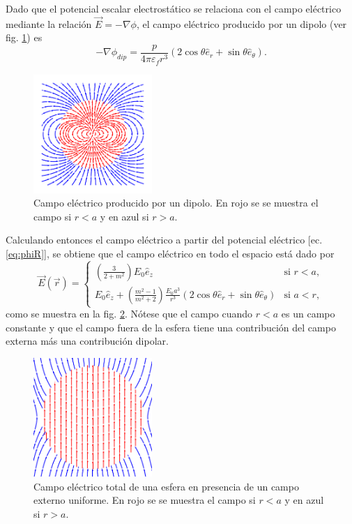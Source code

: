 \documentclass[letterpaper, 12pt] {article}
\begin{document}
Dado que el potencial escalar electrostático se relaciona con el campo eléctrico mediante la relación $\vec{E}=-\nabla\phi$,  el campo eléctrico producido por un dipolo (ver fig. \ref{fig:dip}) es
\begin{equation*}
- \nabla\phi_{dip} = \frac{p}{4\pi\varepsilon_f r^3} (2\cos\theta\hat{e}_r + \sin\theta\hat{e}_\theta).
\end{equation*}
\begin{figure}[t]\centering
\begin{minipage}{.8\linewidth}\centering
\includegraphics[width=4.5cm]{dipolo}
\caption{\footnotesize  Campo eléctrico producido por un dipolo. En rojo se se muestra el campo si $r<	a$ y en azul si $r>a$.}
\label{fig:dip}
\end{minipage}
\end{figure}
Calculando entonces el campo eléctrico a partir del potencial eléctrico [ec. \eqref{eq:phiR}], se obtiene que el campo eléctrico en todo el espacio está dado por
\begin{equation}
\vec{E} (\vec{r}) = \left\{ 
	\begin{array}{ll}
	\left( \frac{3}{2+m^2} \right) E_0 \hat{e}_z & \mbox{si } r<a,\\
	 E_0\hat{e}_z + \left(\frac{m^2-1}{m^2+2}\right)\frac{E_0 a^3}{r^3} (2\cos\theta\hat{e}_r + \sin\theta\hat{e}_\theta) &\mbox{si }  a<r,
	\end{array} \right.\label{eq:Eest}
\end{equation}
como se muestra en la fig. \ref{fig:Eest}. Nótese que el campo cuando $r<a$ es un campo constante y que el campo fuera de la esfera tiene una contribución del campo externa más una contribución dipolar.
\begin{figure}[h]\centering
\begin{minipage}{.8\linewidth}\centering
\includegraphics[width=4.5cm]{campoEst}
\caption{\footnotesize  Campo eléctrico total de una esfera en presencia de un campo externo uniforme.  En rojo se se muestra el campo si $r<	a$ y en azul si $r>a$.}
\label{fig:Eest}
\end{minipage}
\end{figure}
\end{document}
